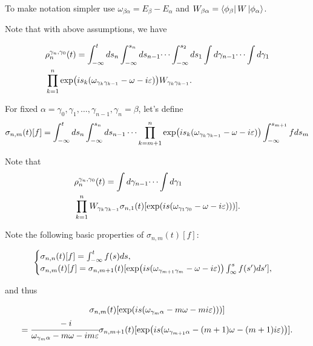 \documentclass[main.tex]{subfiles}
\begin{document}
To make notation simpler use $\omega_{\beta\alpha} = E_\beta - E_\alpha$ and
$W_{\beta\alpha} = \bra{\phi_\beta}W\ket{\phi_\alpha}$.

Note that with above assumptions, we have

\begin{align*}
& \rho^{\gamma_n, \gamma_0}_n(t) = \int_{-\infty}^t ds_n \int_{-\infty}^{s_n} ds_{n - 1}\dots \int_{-\infty}^{s_2} ds_1 \int d\gamma_{n-1} \dots \int d\gamma_1 \\
& \prod_{k=1}^n \exp(is_k(\omega_{\gamma_k\gamma_{k - 1}} - \omega -i\eepsilon)) W_{\gamma_k \gamma_{k - 1}}.
\end{align*}

For fixed $\alpha = \gamma_0, \gamma_1, \dots, \gamma_{n-1}, \gamma_n = \beta$,
let's define
\begin{equation}
\sigma_{n,m}(t)[f] = \int_{-\infty}^t ds_n \int_{-\infty}^{s_n} ds_{n - 1}\dots \prod_{k=m + 1}^{n} \exp(is_k(\omega_{\gamma_k\gamma_{k - 1}} - \omega -i\eepsilon)) \int_{-\infty}^{s_{m + 1}} fds_m
\end{equation}

Note that
\begin{align*}
& \rho^{\gamma_n, \gamma_0}_n(t) = \int d\gamma_{n-1} \dots \int d\gamma_1 \\
& \prod_{k=1}^n W_{\gamma_k \gamma_{k - 1}}\sigma_{n,1}(t)[\exp(is(\omega_{\gamma_{1}\gamma_0} - \omega -i\eepsilon)))].
\end{align*}

Note the following basic properties of $\sigma_{n,m}(t)[f]$:

\begin{equation}
\begin{cases}
\sigma_{n,n}(t)[f] = \int_{-\infty}^t f(s) ds,\\
\sigma_{n,m}(t)[f] = \sigma_{n,m + 1}(t)[\exp(is(\omega_{\gamma_{m+1}\gamma_{m}} - \omega -i\eepsilon))\int^s_{\infty} f(s') ds'],
\end{cases}
\end{equation}

and thus

\begin{multline}
\sigma_{n,m}(t)[\exp(is(\omega_{\gamma_{m}\alpha} - m\omega -mi\eepsilon)))]\\
= \cfrac{-i}{\omega_{\gamma_{m}\alpha} - m\omega -im\eepsilon}\sigma_{n,m + 1}(t)[\exp(is(\omega_{\gamma_{m+1}\alpha} - (m+1)\omega -(m+1)i\eepsilon))].\\
\end{multline}
\end{document}
